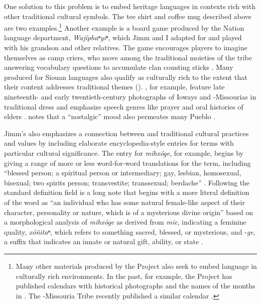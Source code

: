 \documentclass[output=paper]{LSP/langsci}
\begin{document}
One solution to this problem is to embed heritage languages in contexts rich with other traditional cultural symbols. The tee shirt and coffee mug described above are two examples.\footnote{Many other materials produced by the Project also seek to embed language in culturally rich environments. In the past, for example, the Project has published calendars with historical photographs and the names of the months in  \citep{Goodtracks1985}. The -Missouria Tribe recently published a similar calendar \citep{OtoeMissouriaLD2014}.}  Another example is a board game produced by the  Nation language department, \emph{Wajíphaⁿyiⁿ}, which Jimm and I adapted for  and played with his grandson and other relatives. The game encourages players to imagine themselves as camp criers, who move among the traditional moieties of the tribe answering vocabulary questions to accumulate clan counting sticks \citep{KanzaLP2004}. Many  produced for Siouan languages also qualify as culturally rich to the extent that their content addresses traditional themes (\citealt[e.g.][]{HartmannMarschke2010, KanzaLP2010}).  , for example, feature late nineteenth- and early twentieth-century photographs of Ioways and -Missourias in traditional dress and emphasize speech genres like prayer and oral histories of elders \citep{OtoeIowaWistrandRobinson1977, OtoeIowaWistrandRobinson1978}.  notes that a ``nostalgic'' mood also permeates many Pueblo .

Jimm's  also emphasizes a connection between  and traditional cultural practices and values by including elaborate encyclopedia-style entries for terms with particular cultural significance. The entry for \emph{mihxóge}, for example, begins by giving a range of more or less word-for-word  translations for the term, including ``blessed person; a spiritual person or intermediary; gay, lesbian, homosexual, bisexual; two spirits person; transvestite; transsexual; berdache'' \citep[6]{Goodtracks2008}. Following the standard definition field is a long note that begins with a more literal definition of the word as ``an individual who has some natural female-like aspect of their character, personality or nature, which is of a mysterious divine origin'' based on a morphological analysis of \emph{mihxóge} as derived from \emph{mie}, indicating a feminine quality, \emph{xóñitaⁿ}, which refers to something sacred, blessed, or mysterious, and -\emph{ge}, a suffix that indicates an innate or natural gift, ability, or state \citep[6]{Goodtracks2008}.
\end{document}
